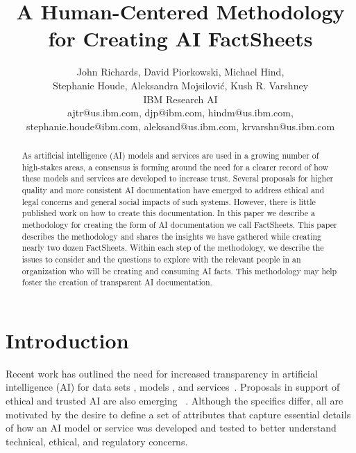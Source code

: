 \documentclass[11pt,dvipdfm]{article}
\begin{document}
\title{A Human-Centered Methodology for Creating AI FactSheets}
\author{John Richards, David Piorkowski, Michael Hind,\\Stephanie Houde, Aleksandra Mojsilovi\'c, Kush R. Varshney\\IBM Research AI\\ajtr@us.ibm.com, djp@ibm.com, hindm@us.ibm.com,\\stephanie.houde@ibm.com, aleksand@us.ibm.com, krvarshn@us.ibm.com}

\maketitle
\begin{abstract}
As artificial intelligence (AI) models and services are used in a growing number of high-stakes areas, a consensus is forming around the need for a clearer record of how these models and services are developed to increase trust.
  Several proposals for higher quality and more consistent AI documentation have emerged to address ethical and legal concerns
  and general social impacts of such systems.
  However, there is little published work on how to create this documentation.
  In this paper we describe
  a methodology for creating the form of AI documentation we call FactSheets.
  This paper describes the methodology and shares the insights we have gathered while creating nearly two dozen FactSheets.   
  Within each step of the methodology, we describe the issues
  to consider and the questions to explore with the relevant people in an organization who will be creating and consuming AI facts.
  This methodology may help foster the creation of transparent AI documentation.
\end{abstract}

\section{Introduction}

Recent work has outlined the need for increased transparency in artificial intelligence (AI) for data sets \cite{gebru-2021,data-statements,HollandHNJC2018,dataset-nut-label-2gen-2020}, models \cite{model-cards}, and services~\cite{factsheets-2019}. Proposals in support of ethical and trusted AI are also emerging ~\cite{EuropeanCommission2020,raji2019ml,ieee-2017}. Although the specifics differ, all are motivated by the desire to define a set of attributes that capture essential details of how an AI model or service was developed and tested to better understand technical, ethical, and regulatory concerns.
\end{document}
